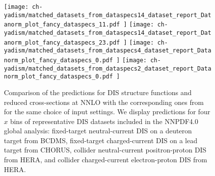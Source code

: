 \begin{figure}[!t]
  \centering
  \texttt{[image: 
    ch-yadism/matched\_datasets\_from\_dataspecs14\_dataset\_report\_Datanorm\_plot\_fancy\_dataspecs\_11.pdf
  ]}
  \texttt{[image: 
    ch-yadism/matched\_datasets\_from\_dataspecs14\_dataset\_report\_Datanorm\_plot\_fancy\_dataspecs\_23.pdf
  ]}
  \texttt{[image: 
    ch-yadism/matched\_datasets\_from\_dataspecs4\_dataset\_report\_Datanorm\_plot\_fancy\_dataspecs\_0.pdf
  ]}
  \texttt{[image: 
    ch-yadism/matched\_datasets\_from\_dataspecs2\_dataset\_report\_Datanorm\_plot\_fancy\_dataspecs\_0.pdf
  ]}
  \caption{
    Comparison of the \yadism predictions for DIS structure
    functions and reduced cross-sections at NNLO with the corresponding ones
    from \apfel for the same choice of input settings.
    We display  predictions for four $x$ bins of representative DIS datasets
    included in the NNPDF4.0 global analysis: fixed-target neutral-current DIS
    on a deuteron target from BCDMS, fixed-target charged-current DIS on a lead
    target from CHORUS, collider neutral-current positron-proton DIS from HERA,
    and collider charged-current electron-proton DIS from HERA.
  }    
  \label{fig:dis/benchmark-apfel-yadism}
\end{figure}
